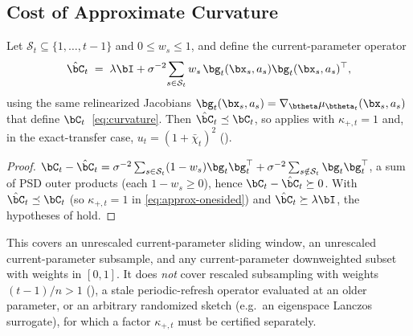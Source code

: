 \subsection{Cost of Approximate Curvature}

\begin{proposition}\label{prop:window}
Let $\mathcal{S}_t\subseteq\{1,\dots,t{-}1\}$ and $0\le w_s\le1$, and define the
current-parameter operator
\[
  \hat\bC_t
  \;=\;
  \lambda\bI
  +\sigma^{-2}\!\sum_{s\in\mathcal{S}_t} w_s\,
  \bg_t(\bx_s,a_s)\bg_t(\bx_s,a_s)^\top ,
\]
using the same relinearized Jacobians $\bg_t(\bx_s,a_s)=\nabla_{\btheta}
\mu_{\btheta_t}(\bx_s,a_s)$ that define $\bC_t$~\eqref{eq:curvature}.  Then
$\hat\bC_t\preceq\bC_t$, so  applies with
$\kappa_{+,t}=1$ and, in the exact-transfer case, $u_t=(1+\bar\chi_t)^2$
().
\end{proposition}
\begin{proof}
$\bC_t-\hat\bC_t=\sigma^{-2}\sum_{s\in\mathcal{S}_t}(1-w_s)\bg_t\bg_t^\top
+\sigma^{-2}\sum_{s\notin\mathcal{S}_t}\bg_t\bg_t^\top$, a sum of PSD outer
products (each $1-w_s\ge0$), hence $\bC_t-\hat\bC_t\succeq0$.  With
$\hat\bC_t\preceq\bC_t$ (so $\kappa_{+,t}=1$ in
\eqref{eq:approx-onesided}) and $\hat\bC_t\succeq\lambda\bI$, the hypotheses of
 hold.
\end{proof}

\noindent
This covers an unrescaled current-parameter sliding window, an unrescaled
current-parameter subsample, and any current-parameter downweighted subset with
weights in $[0,1]$.  It does \emph{not} cover rescaled subsampling with weights
$(t{-}1)/n>1$ (), a stale periodic-refresh operator evaluated
at an older parameter, or an arbitrary randomized sketch (e.g.\ an eigenspace
Lanczos surrogate), for which a factor
$\kappa_{+,t}$ must be certified separately.

